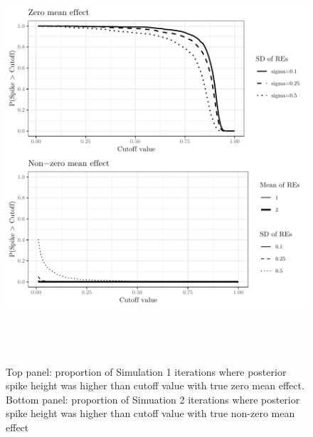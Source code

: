 \documentclass[AMA,STIX1COL]{WileyNJD-v2}
\begin{document}
\begin{figure}
\includegraphics[height = 6in, width = 6in]{SSP-plot.pdf}
\caption{Top panel: proportion of Simulation 1 iterations where posterior spike height was higher than cutoff value with true zero mean effect.
Bottom panel: proportion of Simuation 2 iterations where posterior spike height was higher than cutoff value with true non-zero mean effect}
\label{fig:SSP-cutplot}
\end{figure}
\end{document}
